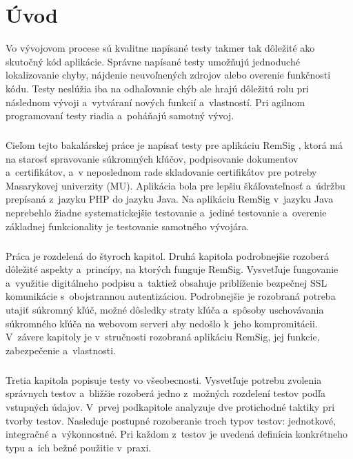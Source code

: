 \documentclass[
  digital, %
  table,   %
oneside,
  nolof,     %
  nolot,     %
]{fithesis3}
\begin{document}
\chapter{Úvod}
Vo vývojovom procese sú kvalitne napísané testy takmer tak dôležité ako skutočný kód aplikácie. Správne napísané testy umožňujú jednoduché lokalizovanie chyby, nájdenie neuvoľnených zdrojov alebo overenie funkčnosti kódu. Testy neslúžia iba na odhaľovanie chýb ale hrajú dôležitú rolu pri následnom vývoji a~vytváraní nových funkcií a~vlastností. Pri agilnom programovaní \cite{agileDef} testy riadia a~poháňajú samotný vývoj. \paragraph{}
Cieľom tejto bakalárskej práce je napísať testy pre aplikáciu RemSig \cite{remsigMuni}, ktorá má na starosť spravovanie súkromných kľúčov, podpisovanie dokumentov a~certifikátov, a~v neposlednom rade skladovanie certifikátov pre potreby Masarykovej univerzity (MU). Aplikácia bola pre lepšiu škáľovateľnosť a~údržbu prepísaná z~jazyku PHP do jazyku Java. Na aplikáciu RemSig  v~jazyku Java neprebehlo žiadne systematickejšie testovanie a~jediné testovanie a~overenie základnej funkcionality je testovanie samotného vývojára.\paragraph{}
Práca je rozdelená do štyroch kapitol. Druhá kapitola podrobnejšie rozoberá dôležité aspekty a~princípy, na ktorých funguje RemSig. Vysvetľuje fungovanie a~využitie digitálneho podpisu a~taktiež obsahuje priblíženie bezpečnej SSL komunikácie s~obojstrannou autentizáciou. Podrobnejšie je rozobraná potreba utajiť súkromný kľúč, možné dôsledky straty kľúča a~spôsoby uschovávania súkromného kľúča na webovom serveri aby nedošlo k~jeho kompromitácii. V~závere kapitoly  je v~stručnosti rozobraná aplikáciu RemSig, jej funkcie, zabezpečenie a~vlastnosti. \paragraph{}
Tretia kapitola popisuje testy vo všeobecnosti. Vysvetľuje potrebu zvolenia správnych testov a~bližšie rozoberá jedno z~možných rozdelení testov podľa vstupných údajov. V~prvej podkapitole analyzuje dve protichodné taktiky pri tvorby testov. Nasleduje postupné rozoberanie troch typov testov: jednotkové, integračné a~výkonnostné. Pri každom z~testov je uvedená definícia konkrétneho typu a~ich bežné použitie v~praxi.\paragraph{}
\end{document}
